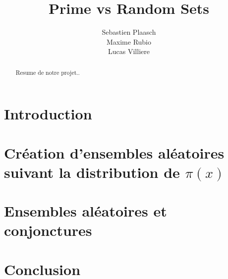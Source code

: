 \documentclass{article}
\begin{document}
\author{Sebastien Plaasch \\ Maxime Rubio  \\ Lucas Villiere}
\title{Prime vs Random Sets}
\maketitle
\newpage 
\begin{abstract}
    Resume de notre projet..
\end{abstract}
\newpage
\tableofcontents


\newpage

\section*{Introduction}
    \label{sec:intro}


\section{Création d'ensembles aléatoires suivant la distribution de $\pi(x)$}
    \label{sec:sec1}
    
    
    

\section{Ensembles aléatoires et conjonctures}
    
	
		
\section*{Conclusion}

\newpage
\printindex
\end{document}
